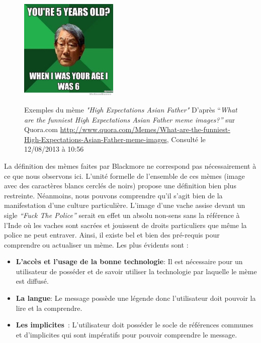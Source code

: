 \begin{figure}
{        \includegraphics[width=1.8449in,height=1.9in]{figures/chap2/chapitre2-img13.jpg}
    }
    \caption[Mème "High Expectations Asian Father" d'après Quora.com]{Exemples du m\`eme \textit{"High Expectations Asian Father"} D{\textquoteright}apr\`es {\textquotedblleft}\textit{What are the funniest High Expectations Asian Father meme images?{\textquotedblright}} sur Quora.com \url{http://www.quora.com/Memes/What-are-the-funniest-High-Expectations-Asian-Father-meme-images}, Consult\'e le 12/08/2013 \`a 10:56}
\end{figure}

La d\'efinition des m\`emes faites par Blackmore ne correspond pas n\'ecessairement \`a ce que nous observons ici. L{\textquoteright}unit\'e formelle de l{\textquoteright}ensemble de ces m\`emes (image avec des caract\`eres blancs cercl\'es de noirs) propose une d\'efinition bien plus restreinte. N\'eanmoins, nous pouvons comprendre qu{\textquoteright}il s{\textquoteright}agit bien de la manifestation d{\textquoteright}une culture particuli\`ere. L{\textquoteright}image d{\textquoteright}une vache assise devant un sigle \textit{{\textquotedblleft}Fuck The Police{\textquotedblright} }serait en effet un absolu non-sens sans la r\'ef\'erence \`a l{\textquoteright}Inde o\`u les vaches sont sacr\'ees et jouissent de droits particuliers que m\^eme la police ne peut entraver. Ainsi, il existe bel et bien des pr\'e-requis pour comprendre ou actualiser un m\`eme. Les plus \'evidents sont :

\begin{itemize}
    \item \textbf{L’accès et l’usage de la bonne technologie}: Il est nécessaire pour un utilisateur de posséder et de savoir utiliser la technologie par laquelle le mème est diffusé.
    \item \textbf{La langue}: Le message possède une légende donc l’utilisateur doit pouvoir la lire et la comprendre.
    \item \textbf{Les implicites} : L’utilisateur doit posséder le socle de références communes et d’implicites qui sont impératifs pour pouvoir comprendre le message. 
\end{itemize}

